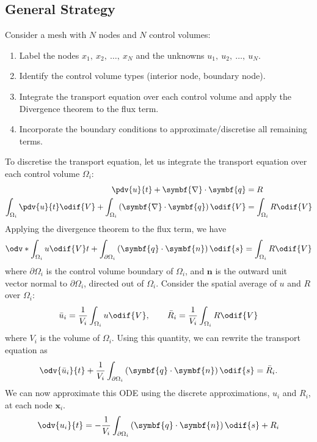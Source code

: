 \documentclass{article}
\begin{document}
\subsection{General Strategy}
Consider a mesh with \(N\) nodes and \(N\) control volumes:
\begin{enumerate}
    \item Label the nodes \(x_1,\: x_2,\: \ldots,\: x_N\) and the
          unknowns \(u_1,\: u_2,\: \ldots,\: u_N\).
    \item Identify the control volume types (interior node, boundary
          node).
    \item Integrate the transport equation over each control volume and
          apply the Divergence theorem to the flux term.
    \item Incorporate the boundary conditions to approximate/discretise
          all remaining terms.
\end{enumerate}
To discretise the transport equation, let us integrate the transport
equation over each control volume \(\Omega_i\):
\begin{align*}
    \pdv{u}{t} + \symbf{\nabla} \cdot \symbf{q}                                                                  & = R                          \\
    \int_{\Omega_i} \pdv{u}{t} \odif{V} + \int_{\Omega_i} \left( \symbf{\nabla} \cdot \symbf{q} \right) \odif{V} & = \int_{\Omega_i} R \odif{V}
\end{align*}
Applying the divergence theorem to the flux term, we have
\begin{equation*}
    \odv*{\int_{\Omega_i} u \odif{V}}{t} + \int_{\partial \Omega_i} \left( \symbf{q} \cdot \symbf{n} \right) \odif{s} = \int_{\Omega_i} R \odif{V}
\end{equation*}
where \(\partial \Omega_i\) is the control volume boundary of \(\Omega_i\),
and \(\symbf{n}\) is the outward unit vector normal to \(\partial \Omega_i\),
directed out of \(\Omega_i\). Consider the spatial average of \(u\) and
\(R\) over \(\Omega_i\):
\begin{equation*}
    \bar{u}_i = \frac{1}{V_i} \int_{\Omega_i} u \odif{V}, \qquad \bar{R}_i = \frac{1}{V_i} \int_{\Omega_i} R \odif{V}
\end{equation*}
where \(V_i\) is the volume of \(\Omega_i\). Using this quantity, we can
rewrite the transport equation as
\begin{equation*}
    \odv{\bar{u}_i}{t} + \frac{1}{V_i} \int_{\partial \Omega_i} \left( \symbf{q} \cdot \symbf{n} \right) \odif{s} = \bar{R}_i.
\end{equation*}
We can now approximate this ODE using the discrete approximations, \(u_i\)
and \(R_i\), at each node \(\symbf{x}_i\).
\begin{equation*}
    \odv{u_i}{t} = - \frac{1}{V_i} \int_{\partial \Omega_i} \left( \symbf{q} \cdot \symbf{n} \right) \odif{s} + R_i
\end{equation*}
\end{document}
